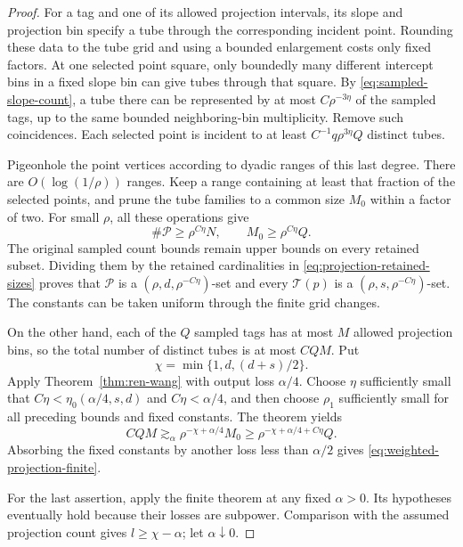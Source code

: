 \begin{proof}
For a tag and one of its allowed projection intervals, its slope
and projection bin specify a tube through the corresponding incident
point. Rounding these data to the tube grid and using a bounded
enlargement costs only fixed factors. At one selected point square,
only boundedly many different intercept bins in a fixed slope bin
can give tubes through that square. By
\eqref{eq:sampled-slope-count}, a tube there can be represented
by at most \(C\rho^{-3\eta}\) of the sampled tags, up to the same
bounded neighboring-bin multiplicity. Remove such coincidences.
Each selected point is incident to at least
\(C^{-1}q\rho^{3\eta}Q\) distinct tubes.

Pigeonhole the point vertices according to dyadic ranges of this
last degree. There are \(O(\log(1/\rho))\) ranges. Keep a range
containing at least that fraction of the selected points, and prune
the tube families to a common size \(M_0\) within a factor of two.
For small \(\rho\), all these operations give
\begin{equation}
 \#\mathcal P\ge \rho^{C\eta}N,\qquad
 M_0\ge \rho^{C\eta}Q .
 \label{eq:projection-retained-sizes}
\end{equation}
The original sampled count bounds remain upper bounds on every
retained subset. Dividing them by the retained cardinalities in
\eqref{eq:projection-retained-sizes} proves that \(\mathcal P\)
is a \((\rho,d,\rho^{-C\eta})\)-set and every
\(\mathcal T(p)\) is a
\((\rho,s,\rho^{-C\eta})\)-set. The constants can be taken uniform
through the finite grid changes.

On the other hand, each of the \(Q\) sampled tags has at most \(M\)
allowed projection bins, so the total number of distinct tubes is
at most \(CQM\). Put
\[
 \chi=\min\{1,d,(d+s)/2\}.
\]
Apply Theorem~\ref{thm:ren-wang} with output loss \(\alpha/4\).
Choose \(\eta\) sufficiently small that
\(C\eta<\eta_0(\alpha/4,s,d)\) and \(C\eta<\alpha/4\), and
then choose \(\rho_1\) sufficiently small for all preceding
bounds and fixed constants. The theorem yields
\[
 CQM\gtrsim_{\alpha}
 \rho^{-\chi+\alpha/4}M_0
 \ge \rho^{-\chi+\alpha/4+C\eta}Q .
\]
Absorbing the fixed constants by another loss less than \(\alpha/2\)
gives \eqref{eq:weighted-projection-finite}.

For the last assertion, apply the finite theorem at any fixed
\(\alpha>0\). Its hypotheses eventually hold because their losses
are subpower. Comparison with the assumed projection count gives
\(l\ge\chi-\alpha\); let \(\alpha\downarrow0\).
\end{proof}

